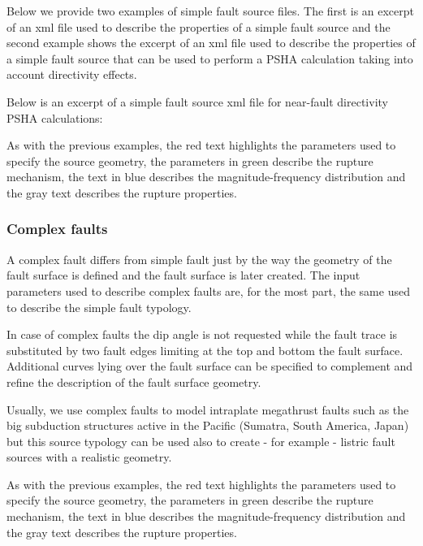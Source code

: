 Below we provide two examples of simple fault source files. The first is an
excerpt of an xml file used to describe the properties of a simple fault
source and the second example shows the excerpt of an xml file used to
describe the properties of a simple fault source that can be used to perform a
PSHA calculation taking into account directivity effects.


\label{example_incremental_mfd}

Below is an excerpt of a simple fault source xml file for near-fault
directivity PSHA calculations:



As with the previous examples, the red text highlights the parameters used to
specify the source geometry, the parameters in green describe the rupture
mechanism, the text in blue describes the magnitude-frequency distribution and
the gray text describes the rupture properties.



\subsubsection{Complex faults}
\label{desc_complex_fault}

A complex fault differs from simple fault just by the way the geometry of the
fault surface is defined and the fault surface is later created. The input
parameters used to describe complex faults are, for the most part, the same
used to describe the simple fault typology.

In case of complex faults the dip angle is not requested while the fault trace
is substituted by two fault edges limiting at the top and bottom the fault
surface. Additional curves lying over the fault surface can be specified to
complement and refine the description of the fault surface geometry.

Usually, we use complex faults to model intraplate megathrust faults such as
the big subduction structures active in the Pacific (Sumatra, South America,
Japan) but this source typology can be used also to create - for example -
listric fault sources with a realistic geometry.



As with the previous examples, the red text highlights the parameters used to
specify the source geometry, the parameters in green describe the rupture
mechanism, the text in blue describes the magnitude-frequency distribution and
the gray text describes the rupture properties.
